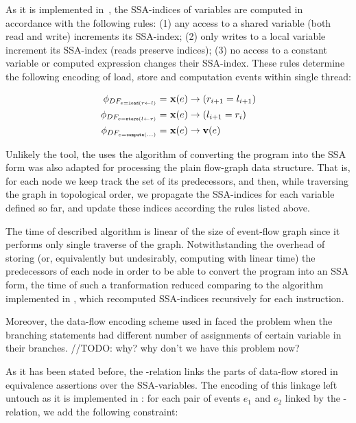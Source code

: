 As it is implemented in~\cite{Porthos17}, the SSA-indices of variables are computed in accordance with the following rules: (1) any access to a shared variable (both read and write) increments its SSA-index; (2) only writes to a local variable increment its SSA-index (reads preserve indices); (3) no access to a constant variable or computed expression changes their SSA-index.
These rules determine the following encoding of load, store and computation events within single thread:

\begin{align}
\phi_{DF_{e = \mathtt{load}(r \leftarrow l)}} = \ & \fx(e) \rightarrow (r_{i+1} = l_{i+1}) \\
\phi_{DF_{e = \mathtt{store}(l \leftarrow r)}} = \ & \fx(e) \rightarrow (l_{i+1} = r_i) \\
\phi_{DF_{e = \mathtt{compute}(...)}} = \ & \fx(e) \rightarrow \fv(e) %
\end{align}

Unlikely the \Porthos tool, the \mousquetaires uses the algorithm of converting the program into the SSA form was also adapted for processing the plain flow-graph data structure. That is, for each node we keep track the set of its predecessors, and then, while traversing the graph in topological order, we propagate the SSA-indices for each variable defined so far, and update these indices according the rules listed above. 

The time of described algorithm is linear of the size of event-flow graph since it performs only single traverse of the graph. Notwithstanding the overhead of storing (or, equivalently but undesirably, computing with%
linear time) the predecessors of each node in order to be able to convert the program into an SSA form, the time of such a tranformation reduced%
comparing to the algorithm implemented in \Porthos, which recomputed SSA-indices recursively for each instruction.%

Moreover, the data-flow encoding scheme used in \Porthos faced the problem when the branching statements had different number of assignments of certain variable in their branches. //TODO: why? why don't we have this problem now? 

As it has been stated before, the \rf-relation links the parts%
of data-flow stored in equivalence assertions over the SSA-variables. 
The encoding of this linkage left untouch as it is implemented in \Porthos: for each pair of events $e_1$ and $e_2$ linked by the \rf-relation, we add the following constraint:

